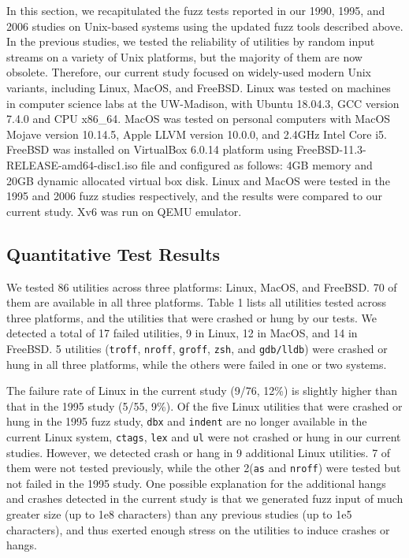 In this section, we recapitulated the fuzz tests reported in our 1990, 1995, and 2006 studies on Unix-based systems using the updated fuzz tools described above. In the previous studies, we tested the reliability of utilities by random input streams on a variety of Unix platforms, but the majority of them are now obsolete. Therefore, our current study focused on widely-used modern Unix variants, including Linux, MacOS, and FreeBSD. Linux was tested on machines in computer science labs at the UW-Madison, with Ubuntu 18.04.3, GCC version 7.4.0 and CPU x86\_64. MacOS was tested on personal computers with MacOS Mojave version 10.14.5, Apple LLVM version 10.0.0, and 2.4GHz Intel Core i5. FreeBSD was installed on VirtualBox 6.0.14 platform using FreeBSD-11.3-RELEASE-amd64-disc1.iso file and configured as follows: 4GB memory and 20GB dynamic allocated virtual box disk. Linux and MacOS were tested in the 1995 and 2006 fuzz studies respectively, and the results were compared to our current study. Xv6 was run on QEMU emulator.




\subsection{Quantitative Test Results}
We tested 86 utilities across three platforms: Linux, MacOS, and FreeBSD. 70 of them are available in all three platforms. Table 1 lists all utilities tested across three platforms, and the utilities that were crashed or hung by our tests. We detected a total of 17 failed utilities, 9 in Linux, 12 in MacOS, and 14 in FreeBSD. 5 utilities (\texttt{troff}, \texttt{nroff}, \texttt{groff}, \texttt{zsh}, and \texttt{gdb/lldb}) were crashed or hung in all three platforms, while the others were failed in one or two systems. 

The failure rate of Linux in the current study (9/76, 12\%) is slightly higher than that in the 1995 study (5/55, 9\%). Of the five Linux utilities that were crashed or hung in the 1995 fuzz study, \texttt{dbx} and \texttt{indent} are no longer available in the current Linux system, \texttt{ctags}, \texttt{lex} and \texttt{ul} were not crashed or hung in our current studies. However, we detected crash or hang in 9 additional Linux utilities. 7 of them were not tested previously, while the other 2(\texttt{as} and \texttt{nroff}) were tested but not failed in the 1995 study. One possible explanation for the additional hangs and crashes detected in the current study is that we generated fuzz input of much greater size  (up to 1e8 characters) than any previous studies (up to 1e5 characters), and thus exerted enough stress on the utilities to induce crashes or hangs. 

